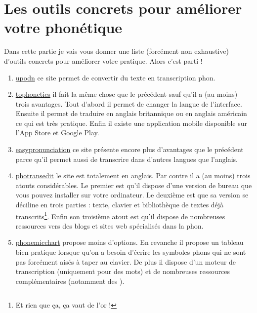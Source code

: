 \chapter{Les outils concrets pour améliorer votre phonétique}

Dans cette partie je vais vous donner une liste (forcément non
exhaustive) d'outils concrets pour améliorer votre pratique. Alors
c'est parti !

\begin{enumerate}
\item \href{http://upodn.com/}{upodn} ce site permet de convertir du
  texte en transcription \gls{phon}.
\item \href{https://tophonetics.com/}{tophonetics} il fait la même
  chose que le précédent sauf qu'il a (au moins) trois avantages. Tout
  d'abord il permet de changer la langue de l'interface. Ensuite il
  permet de traduire en anglais britannique ou en anglais américain ce
  qui est très pratique. Enfin il existe une application mobile
  disponible sur l'App Store et Google Play.
\item \href{https://easypronunciation.com/fr/}{easypronunciation} ce
  site présente encore plus d'avantages que le précédent parce qu'il
  permet aussi de transcrire dans d'autres langues que l'anglais.
\item \href{http://www.photransedit.com/}{photransedit} le site est
  totalement en anglais. Par contre il a (au moins) trois atouts
  considérables. Le premier est qu'il dispose d'une version de bureau
  que vous pouvez installer sur votre ordinateur. Le deuxième est que
  sa version  se déciline en trois parties : texte,
  clavier et bibliothèque de textes déjà transcrits\footnote{Et rien
    que ça, ça vaut de l'or !}. Enfin son troisième atout est qu'il
  dispose de nombreuses ressources vers des blogs et sites web
  spécialisés dans la \gls{phon}.
\item \href{http://www.phonemicchart.com/}{phonemicchart} propose
  moins d'options. En revanche il propose un tableau bien pratique
  lorsque qu'on a besoin d'écrire les symboles \glspl{phon} qui ne sont
  pas forcément aisés à taper au clavier. De plus il dispose d'un
  moteur de transcription (uniquement pour des mots) et de nombreuses
  ressources complémentaires (notamment des ).
\end{enumerate}

\newpage

